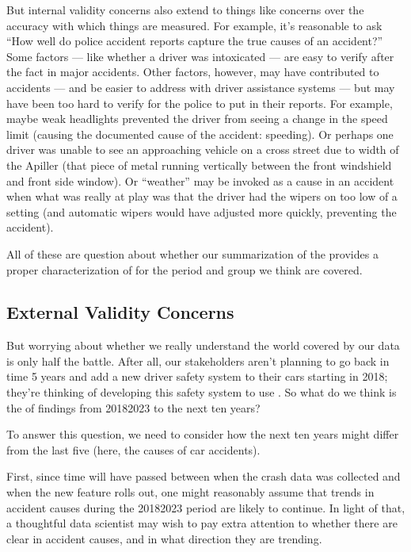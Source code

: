 \documentclass[letterpaper,10pt,english]{jupyterBook}
\begin{document}
\sphinxAtStartPar
But internal validity concerns also extend to things like concerns over the accuracy with which things are measured. For example, it’s reasonable to ask “How well do police accident reports capture the true causes of an accident?” Some factors — like whether a driver was intoxicated — are easy to verify after the fact in major accidents. Other factors, however, may have contributed to accidents — and be easier to address with driver assistance systems — but may have been too hard to verify for the police to put in their reports. For example, maybe weak headlights prevented the driver from seeing a change in the speed limit (causing the documented cause of the accident: speeding). Or perhaps one driver was unable to see an approaching vehicle on a cross street due to width of the A\sphinxhyphen{}piller (that piece of metal running vertically between the front windshield and front side window). Or “weather” may be invoked as a cause in an accident when what was really at play was that the driver had the wipers on too low of a setting (and automatic wipers would have adjusted more quickly, preventing the accident).

\sphinxAtStartPar
All of these are question about whether our summarization of the  provides a proper characterization of  for the period and group we think are covered.


\subsection{External Validity Concerns}
\label{\detokenize{30_questions/15_answering_exploratory_questions:external-validity-concerns}}
\sphinxAtStartPar
But worrying about whether we really understand the world covered by our data is only half the battle. After all, our stakeholders aren’t planning to go back in time 5 years and add a new driver safety system to their cars starting in 2018; they’re thinking of developing this safety system to use . So what do we think is the  of findings from 2018\sphinxhyphen{}2023 to the next ten years?

\sphinxAtStartPar
To answer this question, we need to consider how the next ten years might differ from the last five  (here, the causes of car accidents).

\sphinxAtStartPar
First, since time will have passed between when the crash data was collected and when the new feature rolls out, one might reasonably assume that trends in accident causes during the 2018\sphinxhyphen{}2023 period are likely to continue. In light of that, a thoughtful data scientist may wish to pay extra attention to whether there are clear  in accident causes, and in what direction they are trending.
\end{document}
